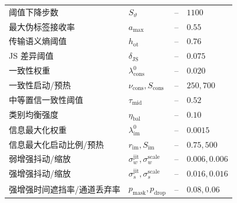 \documentclass{seuthesis-2022}
\begin{document}
{\begin{longtable}{@{}>{\raggedright\arraybackslash}p{}>{\raggedright\arraybackslash}p{}>{\raggedright\arraybackslash}p{}>{\raggedright\arraybackslash}p{}@{}}
    阈值下降步数 & $S_{\vartheta}$ & -- & $1100$ \\
    最大伪标签接收率 & $a_{\max}$ & -- & $0.55$ \\
    传输语义熵阈值 & $h_{\mathrm{ot}}$ & -- & $0.76$ \\
    JS 差异阈值 & $\delta_{\mathrm{JS}}$ & -- & $0.075$ \\
    一致性权重 & $\lambda_{\mathrm{cons}}^0$ & -- & $0.020$ \\
    一致性启动/预热 & $\nu_{\mathrm{cons}},S_{\mathrm{cons}}$ & -- & $250,700$ \\
    中等置信一致性阈值 & $\tau_{\mathrm{mid}}$ & -- & $0.52$ \\
    类别均衡强度 & $\eta_{\mathrm{bal}}$ & -- & $0.10$ \\
    信息最大化权重 & $\lambda_{\mathrm{im}}^0$ & -- & $0.0015$ \\
    信息最大化启动比例/预热 & $r_{\mathrm{im}},S_{\mathrm{im}}$ & -- & $0.75,500$ \\
    弱增强抖动/缩放 & $\sigma_w^{\mathrm{jit}},\sigma_w^{\mathrm{scale}}$ & -- & $0.006,0.006$ \\
    强增强抖动/缩放 & $\sigma_s^{\mathrm{jit}},\sigma_s^{\mathrm{scale}}$ & -- & $0.016,0.016$ \\
    强增强时间遮挡率/通道丢弃率 & $p_{\mathrm{mask}},p_{\mathrm{drop}}$ & -- & $0.08,0.06$ \\
\end{longtable}
}
\end{document}

